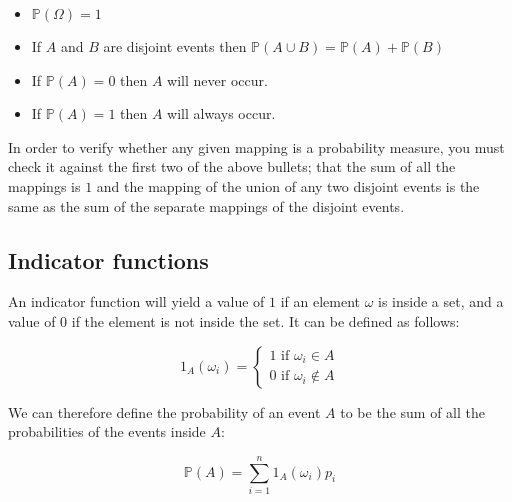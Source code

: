 \documentclass{article}
\begin{document}
\begin{itemize}
	\item $\mathbb{P}(\Omega) = 1$
	\item If $A$ and $B$ are disjoint events then $\mathbb{P}(A \cup B) = \mathbb{P}(A) + \mathbb{P}(B)$
	\item If $\mathbb{P}(A) = 0$ then $A$ will never occur.
	\item If $\mathbb{P}(A) = 1$ then $A$ will always occur.
\end{itemize}


In order to verify whether any given mapping is a probability measure, you must
check it against the first two of the above bullets; that the sum of all the
mappings is $1$ and the mapping of the union of any two disjoint events is the
same as the sum of the separate mappings of the disjoint events.

\subsection{Indicator functions}

An indicator function will yield a value of $1$ if an element $\omega$ is inside
a set, and a value of $0$ if the element is not inside the set. It can be
defined as follows:

\[
	1_A(\omega_i) = \begin{cases} 
						1\textrm{ if }\omega_i \in A\\
						0\textrm{ if }\omega_i \not\in A
					\end{cases}
\]

We can therefore define the probability of an event $A$ to be the sum of all the
probabilities of the events inside $A$:

\[
	\mathbb{P}(A) = \sum\limits_{i=1}^n1_A(\omega_i)p_i
\]

\end{document}
